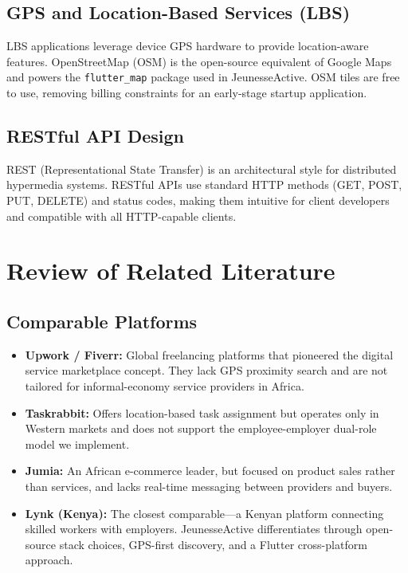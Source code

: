 \documentclass[12pt,a4paper]{report}
\begin{document}
\subsection{GPS and Location-Based Services (LBS)}
LBS applications leverage device GPS hardware to provide location-aware features. OpenStreetMap (OSM) is the open-source equivalent of Google Maps and powers the \texttt{flutter\_map} package used in JeunesseActive. OSM tiles are free to use, removing billing constraints for an early-stage startup application.

\subsection{RESTful API Design}
REST (Representational State Transfer) is an architectural style for distributed hypermedia systems. RESTful APIs use standard HTTP methods (GET, POST, PUT, DELETE) and status codes, making them intuitive for client developers and compatible with all HTTP-capable clients.

\section{Review of Related Literature}

\subsection{Comparable Platforms}
\begin{itemize}
  \item \textbf{Upwork / Fiverr:} Global freelancing platforms that pioneered the digital service marketplace concept. They lack GPS proximity search and are not tailored for informal-economy service providers in Africa.
  \item \textbf{Taskrabbit:} Offers location-based task assignment but operates only in Western markets and does not support the employee-employer dual-role model we implement.
  \item \textbf{Jumia:} An African e-commerce leader, but focused on product sales rather than services, and lacks real-time messaging between providers and buyers.
  \item \textbf{Lynk (Kenya):} The closest comparable—a Kenyan platform connecting skilled workers with employers. JeunesseActive differentiates through open-source stack choices, GPS-first discovery, and a Flutter cross-platform approach.
\end{itemize}
\end{document}
